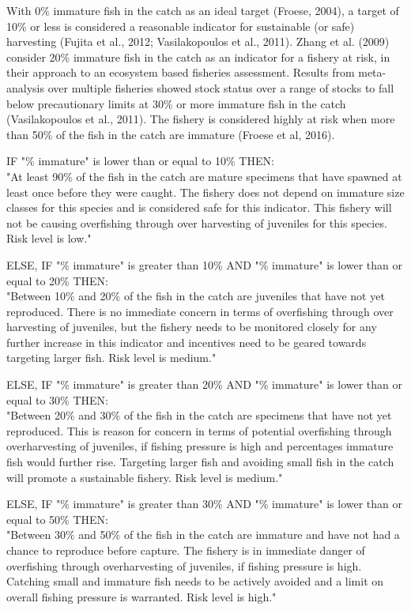 With 0\% immature fish in the catch as an ideal target (Froese, 2004), a target of 10\% or less is considered a reasonable indicator for sustainable (or safe) harvesting (Fujita et al., 2012; Vasilakopoulos et al., 2011). Zhang et al. (2009) consider 20\% immature fish in the catch as an indicator for a fishery at risk, in their approach to an ecosystem based fisheries assessment. Results from meta-analysis over multiple fisheries showed stock status over a range of stocks to fall below precautionary limits at 30\% or more immature fish in the catch (Vasilakopoulos et al., 2011). The fishery is considered highly at risk when more than 50\% of the fish in the catch are immature (Froese et al, 2016).

IF "\% immature" is lower than or equal to 10\% THEN:\\[0cm]
"At least 90\% of the fish in the catch are mature specimens that have spawned at least once before they were caught. The fishery does not depend on immature size classes for this species and is considered safe for this indicator. This fishery will not be causing overfishing through over harvesting of juveniles for this species. Risk level is low."

ELSE, IF "\% immature" is greater than 10\% AND "\% immature" is lower than or equal to 20\% THEN:\\[0cm]
"Between 10\% and 20\% of the fish in the catch are juveniles that have not yet reproduced. There is no immediate concern in terms of overfishing through over harvesting of juveniles, but the fishery needs to be monitored closely for any further increase in this indicator and incentives need to be geared towards targeting larger fish. Risk level is medium."

ELSE, IF "\% immature" is greater than 20\% AND "\% immature" is lower than or equal to 30\% THEN:\\[0cm]
"Between 20\% and 30\% of the fish in the catch are specimens that have not yet reproduced. This is reason for concern in terms of potential overfishing through overharvesting of juveniles, if fishing pressure is high and percentages immature fish would further rise. Targeting larger fish and avoiding small fish in the catch will promote a sustainable fishery. Risk level is medium."

\clearpage
\newpage

ELSE, IF "\% immature" is greater than 30\% AND "\% immature" is lower than or equal to 50\% THEN:\\[0cm]
"Between 30\% and 50\% of the fish in the catch are immature and have not had a chance to reproduce before capture. The fishery is in immediate danger of overfishing through overharvesting of juveniles, if fishing pressure is high.  Catching small and immature fish needs to be actively avoided and a limit on overall fishing pressure is warranted. Risk level is high."

